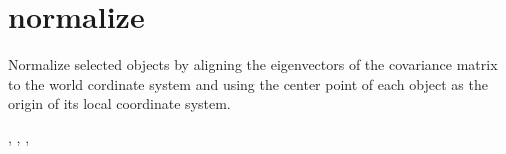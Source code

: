\documentclass[letterpaper,10pt,english]{sphinxmanual}
\begin{document}
\section{normalize}
\label{\detokenize{pk_src.normalize:normalize}}\label{\detokenize{pk_src.normalize::doc}}\label{\detokenize{pk_src.normalize:id1}}
{\hyperref[\detokenize{index:commands}]{}}
\label{\detokenize{pk_src.normalize:module-pk_src.normalize}}
Normalize selected objects by aligning the eigenvectors of the covariance matrix to the world cordinate system and using the center point of each object as the origin of its local coordinate system.

 {\hyperref[\detokenize{pk_src.alignObj:alignobj}]{}}, {\hyperref[\detokenize{pk_src.eigenvector:eigenvector}]{}}, {\hyperref[\detokenize{pk_src.centerPoint:centerpoint}]{}}, {\hyperref[\detokenize{pk_src.centroidPoint:centroidpoint}]{}}
\end{document}
